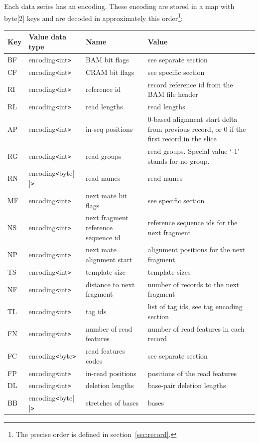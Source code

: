 \documentclass[a4paper]{article}
\begin{document}
Each data series has an encoding. These encoding are stored in a map with byte[2] 
keys and are decoded in approximately this order\footnote{The precise order is defined in section~\ref{sec:record}.}:

\begin{threeparttable}[t]
\begin{tabular}{|l|l|>{\raggedright}p{100pt}|>{\raggedright}p{220pt}|}
\hline
\textbf{Key} & \textbf{Value data type} & \textbf{Name} & \textbf{Value}\tabularnewline
\hline
BF & encoding\texttt{<}int\texttt{>} & BAM bit flags & see separate section\tabularnewline
\hline
CF & encoding\texttt{<}int\texttt{>} & CRAM bit flags & see specific section\tabularnewline
\hline
RI & encoding\texttt{<}int\texttt{>} & reference id & record reference id from
the BAM file header\tabularnewline
\hline
RL & encoding\texttt{<}int\texttt{>} & read lengths & read lengths\tabularnewline
\hline
AP & encoding\texttt{<}int\texttt{>} & in-seq positions & 0-based alignment start
delta from previous record, or 0 if the first record in the slice\tabularnewline
\hline
RG & encoding\texttt{<}int\texttt{>} & read groups & read groups. Special value 
`-1' stands for no group.\tabularnewline
\hline
RN\tnote{a} & encoding\texttt{<}byte[ ]\texttt{>} & read names & read names\tabularnewline
\hline
MF & encoding\texttt{<}int\texttt{>} & next mate bit flags & see specific section\tabularnewline
\hline
NS & encoding\texttt{<}int\texttt{>} & next fragment reference sequence id & reference 
sequence ids for the next fragment \tabularnewline
\hline
NP & encoding\texttt{<}int\texttt{>} & next mate alignment start & alignment positions 
for the next fragment\tabularnewline
\hline
TS & encoding\texttt{<}int\texttt{>} & template size & template sizes\tabularnewline
\hline
NF & encoding\texttt{<}int\texttt{>} & distance to next fragment & number of records
to the next fragment\tnote{b}\tabularnewline
\hline
TL\tnote{c} & encoding\texttt{<}int\texttt{>} & tag ids  & list of tag ids, see tag encoding
section\tabularnewline
\hline
FN & encoding\texttt{<}int\texttt{>} & number of read features & number of read
features in each record\tabularnewline
\hline
FC & encoding\texttt{<}byte\texttt{>} & read features codes & see separate section\tabularnewline
\hline
FP & encoding\texttt{<}int\texttt{>} & in-read positions & positions of the read
features\tabularnewline
\hline
DL & encoding\texttt{<}int\texttt{>} & deletion lengths & base-pair deletion lengths\tabularnewline
\hline
BB & encoding\texttt{<}byte[ ]\texttt{>} & stretches of bases & bases\tabularnewline
\hline

\end{tabular}
\end{threeparttable}
\end{document}
